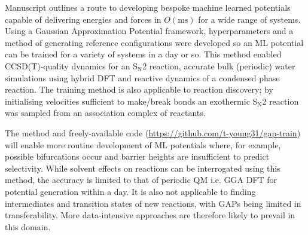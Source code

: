 \documentclass[../../main.tex]{subfiles}
\begin{document}
Manuscript  outlines a route to developing bespoke machine learned potentials capable of delivering energies and forces in $O(\text{ms})$ for a wide range of systems. Using a Gaussian Approximation Potential framework,\cite{Bartok2010} hyperparameters and a method of generating reference configurations were developed so an ML potential can be trained for a variety of systems in a day or so. This method enabled CCSD(T)-quality dynamics for an S${}_\text{N}$2 reaction, accurate bulk (periodic) water simulations using hybrid DFT and reactive dynamics of a condensed phase reaction. The training method is also applicable to reaction discovery; by initialising velocities sufficient to make/break bonds an exothermic  S${}_\text{N}$2 reaction was sampled from an association complex of reactants.

The method and freely-available code ({\url{https://github.com/t-young31/gap-train}}) will enable more routine development of ML potentials where, for example, possible bifurcations occur and barrier heights are insufficient to predict selectivity.\cite{Feng2021} While solvent effects on reactions can be interrogated using this method, the accuracy is limited to that of periodic QM i.e. GGA DFT for potential generation within a day. It is also not applicable to finding intermediates and transition states of new reactions, with GAPs being limited in transferability. More data-intensive approaches are therefore likely to prevail in this domain.\cite{Smith2017, Devereux2020} 


\clearpage
\end{document}
